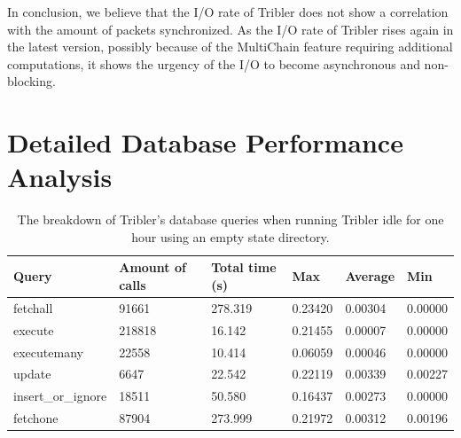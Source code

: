 In conclusion, we believe that the I/O rate of Tribler does not show a correlation with the amount of packets synchronized. As the I/O rate of Tribler rises again in the latest version, possibly because of the MultiChain feature requiring additional computations, it shows the urgency of the I/O to become asynchronous and non-blocking.

\section{Detailed Database Performance Analysis}
\label{sct:db_performance_analysis}

\begin{table}[h]
	\centering
	\caption{The breakdown of Tribler's database queries when running Tribler idle for one hour using an empty state directory.}
	\label{table:query_breakdown_tribler_empty_state_dir}
	\begin{tabular}{|l|l|l|l|l|l|}
		\hline
		\textbf{Query}     & \textbf{Amount of calls} & \textbf{Total time (s)} & \textbf{Max} & \textbf{Average} & \textbf{Min} \\ \hline
		fetchall           & 91661                    & 278.319                 & 0.23420      & 0.00304          & 0.00000      \\ \hline
		execute            & 218818                   & 16.142                  & 0.21455      & 0.00007          & 0.00000      \\ \hline
		executemany        & 22558                    & 10.414                  & 0.06059      & 0.00046          & 0.00000      \\ \hline
		update             & 6647                     & 22.542                  & 0.22119      & 0.00339          & 0.00227      \\ \hline
		insert\_or\_ignore & 18511                    & 50.580                  & 0.16437      & 0.00273          & 0.00000      \\ \hline
		fetchone           & 87904                    & 273.999                 & 0.21972      & 0.00312          & 0.00196      \\ \hline
	\end{tabular}
\end{table}

